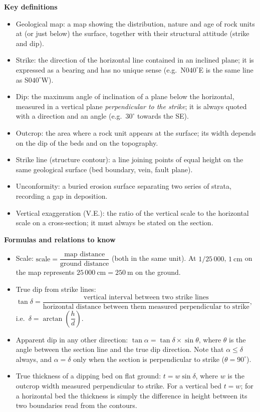 \documentclass[11pt]{article}
\newcommand{\cle}[1]{{\popxbold\color{popdark}#1}}
\begin{document}
\begin{bilan}
\textbf{Key definitions}
\begin{itemize}
\item \cle{Geological map}: a map showing the distribution, nature and age of rock units at (or just below) the surface, together with their structural attitude (strike and dip).
\item \cle{Strike}: the direction of the horizontal line contained in an inclined plane; it is expressed as a bearing and has no unique sense (e.g.\ N$040^{\circ}$E is the same line as S$040^{\circ}$W).
\item \cle{Dip}: the maximum angle of inclination of a plane below the horizontal, measured in a vertical plane \emph{perpendicular to the strike}; it is always quoted with a direction and an angle (e.g.\ $30^{\circ}$ towards the SE).
\item \cle{Outcrop}: the area where a rock unit appears at the surface; its width depends on the dip of the beds and on the topography.
\item \cle{Strike line} (structure contour): a line joining points of equal height on the same geological surface (bed boundary, vein, fault plane).
\item \cle{Unconformity}: a buried erosion surface separating two series of strata, recording a gap in deposition.
\item \cle{Vertical exaggeration} (V.E.): the ratio of the vertical scale to the horizontal scale on a cross-section; it must always be stated on the section.
\end{itemize}

\textbf{Formulas and relations to know}
\begin{itemize}
\item Scale: $\text{scale} = \dfrac{\text{map distance}}{\text{ground distance}}$ (both in the same unit). At $1/25\,000$, $1\ \mathrm{cm}$ on the map represents $25\,000\ \mathrm{cm} = 250\ \mathrm{m}$ on the ground.
\item True dip from strike lines: $\tan\delta = \dfrac{\text{vertical interval between two strike lines}}{\text{horizontal distance between them measured perpendicular to strike}}$, i.e.\ $\delta = \arctan\left(\dfrac{h}{d}\right)$.
\item Apparent dip in any other direction: $\tan\alpha = \tan\delta \times \sin\theta$, where $\theta$ is the angle between the section line and the true dip direction. Note that $\alpha \leq \delta$ always, and $\alpha = \delta$ only when the section is perpendicular to strike ($\theta = 90^{\circ}$).
\item True thickness of a dipping bed on flat ground: $t = w\sin\delta$, where $w$ is the outcrop width measured perpendicular to strike. For a vertical bed $t = w$; for a horizontal bed the thickness is simply the difference in height between its two boundaries read from the contours.
\end{itemize}


\end{bilan}
\end{document}
